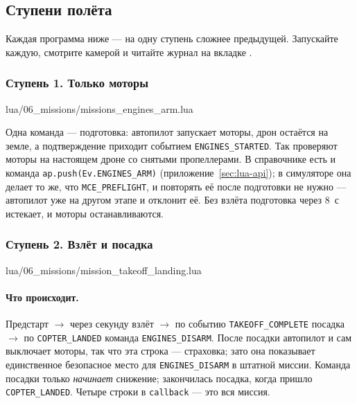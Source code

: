 \subsection{Ступени полёта}

Каждая программа ниже --- на одну ступень сложнее предыдущей. Запускайте каждую, смотрите камерой  и читайте журнал на вкладке .

\subsubsection*{Ступень 1. Только моторы}

\begin{codefile}{lua/06_missions/missions_engines_arm.lua}
\end{codefile}

Одна команда --- подготовка: автопилот запускает моторы, дрон остаётся на земле, а подтверждение приходит событием \verb|ENGINES_STARTED|. Так проверяют моторы на настоящем дроне со снятыми пропеллерами. В справочнике есть и команда \verb|ap.push(Ev.ENGINES_ARM)| (приложение~\ref{sec:lua-api}); в симуляторе она делает то же, что \verb|MCE_PREFLIGHT|, и повторять её после подготовки не нужно --- автопилот уже на другом этапе и отклонит её. Без взлёта подготовка через 8~с истекает, и моторы останавливаются.

\subsubsection*{Ступень 2. Взлёт и посадка}

\begin{codefile}{lua/06_missions/mission_takeoff_landing.lua}
\end{codefile}

\paragraph{Что происходит.} Предстарт $\to$ через секунду взлёт $\to$ по событию \verb|TAKEOFF_COMPLETE| посадка $\to$ по \verb|COPTER_LANDED| команда \verb|ENGINES_DISARM|. После посадки автопилот и сам выключает моторы, так что эта строка --- страховка; зато она показывает единственное безопасное место для \verb|ENGINES_DISARM| в штатной миссии. Команда посадки только \emph{начинает} снижение; закончилась посадка, когда пришло \verb|COPTER_LANDED|. Четыре строки в \verb|callback| --- это вся миссия.

\begin{center}
\end{center}

